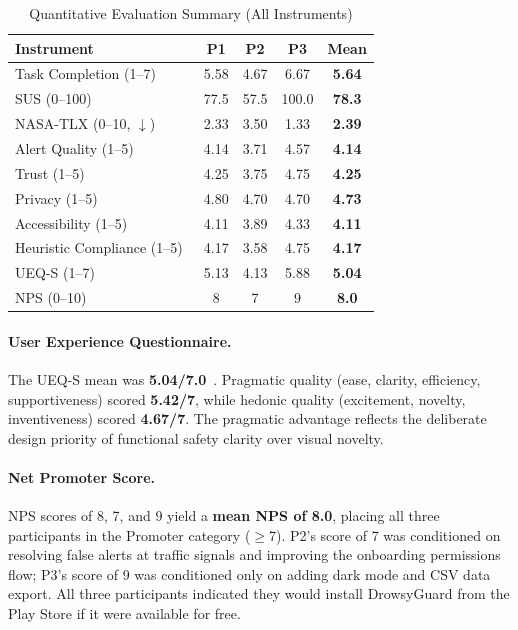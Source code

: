 \documentclass[sigconf]{acmart}
\begin{document}
\begin{table}[H]
\centering
\caption{Quantitative Evaluation Summary (All Instruments)}
\label{tab:quant_summary}
\small
\begin{tabular}{lcccc}
\toprule
\textbf{Instrument} & \textbf{P1} & \textbf{P2} & \textbf{P3} & \textbf{Mean} \\
\midrule
Task Completion (1--7) & 5.58 & 4.67 & 6.67 & \textbf{5.64} \\
SUS (0--100)~\cite{ref15} & 77.5 & 57.5 & 100.0 & \textbf{78.3} \\
NASA-TLX (0--10, $\downarrow$)~\cite{ref16} & 2.33 & 3.50 & 1.33 & \textbf{2.39} \\
Alert Quality (1--5) & 4.14 & 3.71 & 4.57 & \textbf{4.14} \\
Trust (1--5) & 4.25 & 3.75 & 4.75 & \textbf{4.25} \\
Privacy (1--5) & 4.80 & 4.70 & 4.70 & \textbf{4.73} \\
Accessibility (1--5) & 4.11 & 3.89 & 4.33 & \textbf{4.11} \\
Heuristic Compliance (1--5)~\cite{ref27} & 4.17 & 3.58 & 4.75 & \textbf{4.17} \\
UEQ-S (1--7)~\cite{ref17} & 5.13 & 4.13 & 5.88 & \textbf{5.04} \\
NPS (0--10) & 8 & 7 & 9 & \textbf{8.0} \\
\bottomrule
\end{tabular}
\end{table}

\paragraph{User Experience Questionnaire.}
The UEQ-S mean was \textbf{5.04/7.0}~\cite{ref17}. Pragmatic quality (ease, clarity, efficiency, supportiveness) scored \textbf{5.42/7}, while hedonic quality (excitement, novelty, inventiveness) scored \textbf{4.67/7}. The pragmatic advantage reflects the deliberate design priority of functional safety clarity over visual novelty.

\paragraph{Net Promoter Score.}
NPS scores of 8, 7, and 9 yield a \textbf{mean NPS of 8.0}, placing all three participants in the Promoter category ($\geq$7). P2's score of 7 was conditioned on resolving false alerts at traffic signals and improving the onboarding permissions flow; P3's score of 9 was conditioned only on adding dark mode and CSV data export. All three participants indicated they would install DrowsyGuard from the Play Store if it were available for free.
\end{document}
